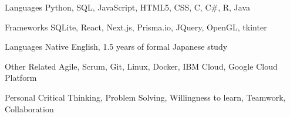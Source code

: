 

\begin{cvskills}

  \cvskill
    {Languages} %
    {Python, SQL, JavaScript, HTML5, CSS, C, C\#, R, Java} %

  \cvskill
    {Frameworks} %
    {SQLite, React, Next.js, Prisma.io, JQuery, OpenGL, tkinter} %

  \cvskill
    {Languages} %
    {Native English, 1.5 years of formal Japanese study} %

  \cvskill
    {Other Related} %
    {Agile, Scrum, Git, Linux, Docker, IBM Cloud, Google Cloud Platform} %

  \cvskill
    {Personal} %
    {Critical Thinking, Problem Solving, Willingness to learn, Teamwork, Collaboration} %

\end{cvskills}
